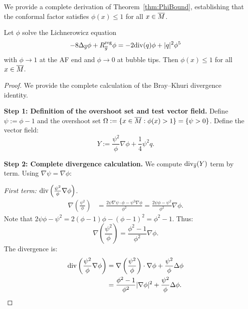 We provide a complete derivation of Theorem~\ref{thm:PhiBound}, establishing that the conformal factor satisfies $\phi(x) \le 1$ for all $x \in \overline{M}$.

\begin{theorem}\label{thm:ConformalComplete}
Let $\phi$ solve the Lichnerowicz equation
\begin{equation}\label{eq:LichnerowiczFull}
    -8\Delta_{\overline{g}} \phi + R_{\overline{g}}^{\mathrm{reg}} \phi = -2\mathrm{div}(q) \phi + |q|^2 \phi^5
\end{equation}
with $\phi \to 1$ at the AF end and $\phi \to 0$ at bubble tips. Then $\phi(x) \le 1$ for all $x \in \overline{M}$.
\end{theorem}

\begin{proof}
We provide the complete calculation of the Bray--Khuri divergence identity.

\textbf{Step 1: Definition of the overshoot set and test vector field.}
Define $\psi := \phi - 1$ and the overshoot set $\Omega := \{x \in \overline{M} : \phi(x) > 1\} = \{\psi > 0\}$. Define the vector field:
\begin{equation}\label{eq:VectorFieldY}
    Y := \frac{\psi^2}{\phi} \nabla \phi + \frac{1}{4} \psi^2 q.
\end{equation}

\textbf{Step 2: Complete divergence calculation.}
We compute $\mathrm{div}_{\overline{g}}(Y)$ term by term. Using $\nabla \psi = \nabla \phi$:

\textit{First term: $\mathrm{div}\left(\frac{\psi^2}{\phi} \nabla \phi\right)$.}
\begin{align}
    \nabla\left(\frac{\psi^2}{\phi}\right) &= \frac{2\psi \nabla \psi \cdot \phi - \psi^2 \nabla \phi}{\phi^2} = \frac{2\psi \phi - \psi^2}{\phi^2} \nabla \phi. \label{eq:GradientQuotient}
\end{align}
Note that $2\psi \phi - \psi^2 = 2(\phi - 1)\phi - (\phi - 1)^2 = \phi^2 - 1$. Thus:
\begin{equation}\label{eq:GradientSimplified}
    \nabla\left(\frac{\psi^2}{\phi}\right) = \frac{\phi^2 - 1}{\phi^2} \nabla \phi.
\end{equation}
The divergence is:
\begin{align}
    \mathrm{div}\left(\frac{\psi^2}{\phi} \nabla \phi\right) &= \nabla\left(\frac{\psi^2}{\phi}\right) \cdot \nabla \phi + \frac{\psi^2}{\phi} \Delta \phi \nonumber\\
    &= \frac{\phi^2 - 1}{\phi^2} |\nabla \phi|^2 + \frac{\psi^2}{\phi} \Delta \phi. \label{eq:DivFirstTerm}
\end{align}


\end{proof}
